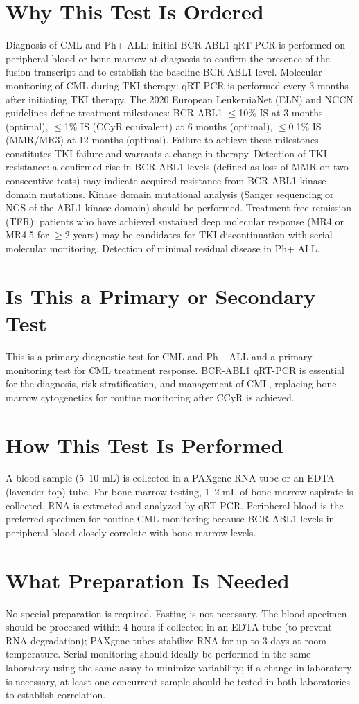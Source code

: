 \section*{Why This Test Is Ordered}
Diagnosis of CML and Ph+ ALL: initial BCR-ABL1 qRT-PCR is performed on peripheral blood or bone marrow at diagnosis to confirm the presence of the fusion transcript and to establish the baseline BCR-ABL1 level. Molecular monitoring of CML during TKI therapy: qRT-PCR is performed every 3 months after initiating TKI therapy. The 2020 European LeukemiaNet (ELN) and NCCN guidelines define treatment milestones: BCR-ABL1 $\leq$10\% IS at 3 months (optimal), $\leq$1\% IS (CCyR equivalent) at 6 months (optimal), $\leq$0.1\% IS (MMR/MR3) at 12 months (optimal). Failure to achieve these milestones constitutes TKI failure and warrants a change in therapy. Detection of TKI resistance: a confirmed rise in BCR-ABL1 levels (defined as loss of MMR on two consecutive tests) may indicate acquired resistance from BCR-ABL1 kinase domain mutations. Kinase domain mutational analysis (Sanger sequencing or NGS of the ABL1 kinase domain) should be performed. Treatment-free remission (TFR): patients who have achieved sustained deep molecular response (MR4 or MR4.5 for $\geq$2 years) may be candidates for TKI discontinuation with serial molecular monitoring. Detection of minimal residual disease in Ph+ ALL.

\section*{Is This a Primary or Secondary Test}
This is a primary diagnostic test for CML and Ph+ ALL and a primary monitoring test for CML treatment response. BCR-ABL1 qRT-PCR is essential for the diagnosis, risk stratification, and management of CML, replacing bone marrow cytogenetics for routine monitoring after CCyR is achieved.

\section*{How This Test Is Performed}
A blood sample (5--10 mL) is collected in a PAXgene RNA tube or an EDTA (lavender-top) tube. For bone marrow testing, 1--2 mL of bone marrow aspirate is collected. RNA is extracted and analyzed by qRT-PCR. Peripheral blood is the preferred specimen for routine CML monitoring because BCR-ABL1 levels in peripheral blood closely correlate with bone marrow levels.

\section*{What Preparation Is Needed}
No special preparation is required. Fasting is not necessary. The blood specimen should be processed within 4 hours if collected in an EDTA tube (to prevent RNA degradation); PAXgene tubes stabilize RNA for up to 3 days at room temperature. Serial monitoring should ideally be performed in the same laboratory using the same assay to minimize variability; if a change in laboratory is necessary, at least one concurrent sample should be tested in both laboratories to establish correlation.

